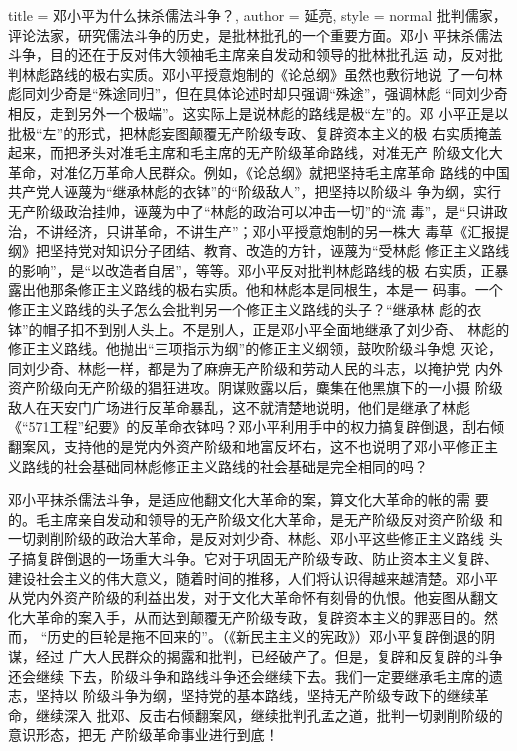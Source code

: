 \begin{hongqiarticle}{
        title  = {邓小平为什么抹杀儒法斗争？},
        author = {延亮},
        style  = normal
    }
    批判儒家，评论法家，研究儒法斗争的历史，是批林批孔的一个重要方面。邓小
    平抹杀儒法斗争，目的还在于反对伟大领袖毛主席亲自发动和领导的批林批孔运
    动，反对批判林彪路线的极右实质。邓小平授意炮制的《论总纲》虽然也敷衍地说
    了一句林彪同刘少奇是“殊途同归”，但在具体论述时却只强调“殊途”，强调林彪
    “同刘少奇相反，走到另外一个极端”。这实际上是说林彪的路线是极“左”的。邓
    小平正是以批极“左”的形式，把林彪妄图颠覆无产阶级专政、复辟资本主义的极
    右实质掩盖起来，而把矛头对准毛主席和毛主席的无产阶级革命路线，对准无产
    阶级文化大革命，对准亿万革命人民群众。例如，《论总纲》就把坚持毛主席革命
    路线的中国共产党人诬蔑为“继承林彪的衣钵”的“阶级敌人”，把坚持以阶级斗
    争为纲，实行无产阶级政治挂帅，诬蔑为中了“林彪的政治可以冲击一切”的“流
    毒”，是“只讲政治，不讲经济，只讲革命，不讲生产”；邓小平授意炮制的另一株大
    毒草《汇报提纲》把坚持党对知识分子团结、教育、改造的方针，诬蔑为“受林彪
    修正主义路线的影响”，是“以改造者自居”，等等。邓小平反对批判林彪路线的极
    右实质，正暴露出他那条修正主义路线的极右实质。他和林彪本是同根生，本是一
    码事。一个修正主义路线的头子怎么会批判另一个修正主义路线的头子？“继承林
    彪的衣钵”的帽子扣不到别人头上。不是别人，正是邓小平全面地继承了刘少奇、
    林彪的修正主义路线。他抛出“三项指示为纲”的修正主义纲领，鼓吹阶级斗争熄
    灭论，同刘少奇、林彪一样，都是为了麻痹无产阶级和劳动人民的斗志，以掩护党
    内外资产阶级向无产阶级的猖狂进攻。阴谋败露以后，麋集在他黑旗下的一小摄
    阶级敌人在天安门广场进行反革命暴乱，这不就清楚地说明，他们是继承了林彪
    《“571工程”纪要》的反革命衣钵吗？邓小平利用手中的权力搞复辟倒退，刮右倾
    翻案风，支持他的是党内外资产阶级和地富反坏右，这不也说明了邓小平修正主
    义路线的社会基础同林彪修正主义路线的社会基础是完全相同的吗？

    邓小平抹杀儒法斗争，是适应他翻文化大革命的案，算文化大革命的帐的需
    要的。毛主席亲自发动和领导的无产阶级文化大革命，是无产阶级反对资产阶级
    和一切剥削阶级的政治大革命，是反对刘少奇、林彪、邓小平这些修正主义路线
    头子搞复辟倒退的一场重大斗争。它对于巩固无产阶级专政、防止资本主义复辟、
    建设社会主义的伟大意义，随着时间的推移，人们将认识得越来越清楚。邓小平
    从党内外资产阶级的利益出发，对于文化大革命怀有刻骨的仇恨。他妄图从翻文
    化大革命的案入手，从而达到颠覆无产阶级专政，复辟资本主义的罪恶目的。然而，
    “历史的巨轮是拖不回来的”。（《新民主主义的宪政》）邓小平复辟倒退的阴谋，经过
    广大人民群众的揭露和批判，已经破产了。但是，复辟和反复辟的斗争还会继续
    下去，阶级斗争和路线斗争还会继续下去。我们一定要继承毛主席的遗志，坚持以
    阶级斗争为纲，坚持党的基本路线，坚持无产阶级专政下的继续革命，继续深入
    批邓、反击右倾翻案风，继续批判孔孟之道，批判一切剥削阶级的意识形态，把无
    产阶级革命事业进行到底！
\end{hongqiarticle}